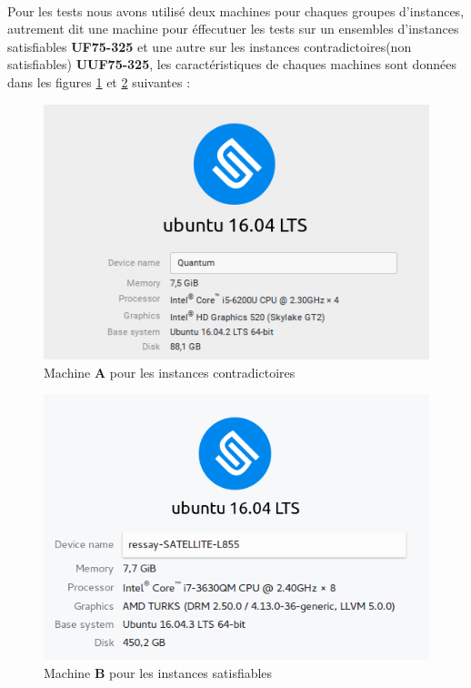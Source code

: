 \paragraph{}
Pour les tests nous avons utilisé deux machines pour chaques groupes d'instances, autrement dit une machine pour éffecutuer les tests sur un ensembles d'instances satisfiables \textbf{UF75-325}\cite{Benchmark} et une autre sur les instances contradictoires(non satisfiables) \textbf{UUF75-325}\cite{Benchmark}, les caractéristiques de chaques machines sont données dans les figures \ref{fig:machineA} et \ref{fig:machineB} suivantes : 
\begin{figure}[H]
	\centering
	\includegraphics[scale=0.75]{images/machineWISS.png}
	\caption{Machine \textbf{A} pour les instances contradictoires}
	\label{fig:machineA}
\end{figure}
\begin{figure}[H]
	\centering
	\includegraphics[scale=0.665]{images/machineYASSER.png}
	\caption{Machine \textbf{B} pour les instances satisfiables}
	\label{fig:machineB}
\end{figure}
\newpage
